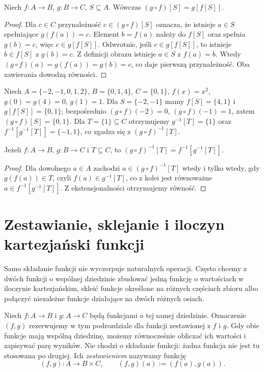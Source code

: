 \begin{twierdzenie}\label{thm:composition-image-xliv}
Niech $f:A\to B$, $g:B\to C$, $S\subseteq A$. Wówczas
$(g\circ f)[S]=g[f[S]]$.
\end{twierdzenie}
\begin{proof}
Dla $c\in C$ przynależność $c\in(g\circ f)[S]$ oznacza,
że istnieje $a\in S$ spełniające $g(f(a))=c$.
Element $b=f(a)$ należy do $f[S]$ oraz spełnia $g(b)=c$,
więc $c\in g[f[S]]$.
Odwrotnie, jeśli $c\in g[f[S]]$, to istnieje $b\in f[S]$
z $g(b)=c$. Z definicji obrazu istnieje $a\in S$ z $f(a)=b$.
Wtedy $(g\circ f)(a)=g(f(a))=g(b)=c$, co daje pierwszą
przynależność. Oba zawierania dowodzą równości.
\end{proof}
\begin{przyklad}
Niech $A=\{-2,-1,0,1,2\}$, $B=\{0,1,4\}$,
$C=\{0,1\}$, $f(x)=x^2$, $g(0)=g(4)=0$, $g(1)=1$.
Dla $S=\{-2,-1\}$ mamy $f[S]=\{4,1\}$ i
$g[f[S]]=\{0,1\}$; bezpośrednio $(g\circ f)(-2)=0$,
$(g\circ f)(-1)=1$, zatem $(g\circ f)[S]=\{0,1\}$.
Dla $T=\{1\}\subseteq C$ otrzymujemy
$g^{-1}[T]=\{1\}$ oraz
$f^{-1}[g^{-1}[T]]=\{-1,1\}$,
co zgadza się z $(g\circ f)^{-1}[T]$.
\end{przyklad}

\begin{twierdzenie}\label{thm:composition-preimage}
Jeżeli $f:A\to B$, $g:B\to C$ i $T\subseteq C$, to $(g\circ f)^{-1}[T]=f^{-1}[g^{-1}[T]]$.
\end{twierdzenie}
\begin{proof}
Dla dowolnego $a\in A$ zachodzi $a\in(g\circ f)^{-1}[T]$ wtedy i tylko wtedy, gdy $g(f(a))\in T$, czyli $f(a)\in g^{-1}[T]$, co z kolei jest równoważne $a\in f^{-1}[g^{-1}[T]]$. Z ekstensjonalności otrzymujemy równość.
\end{proof}

\section{Zestawianie, sklejanie i iloczyn kartezjański funkcji}
Samo składanie funkcji nie wyczerpuje naturalnych operacji. Często chcemy
z dwóch funkcji o wspólnej dziedzinie zbudować jedną funkcję o wartościach
w iloczynie kartezjańskim, skleić funkcje określone na różnych częściach
zbioru albo połączyć niezależne funkcje działające na dwóch różnych osiach.

\begin{definicja}\label{def:pairing-functions}
Niech $f:A\to B$ i $g:A\to C$ będą funkcjami o tej samej dziedzinie.
Oznaczenie $(f,g)$ rezerwujemy w tym podrozdziale dla funkcji
zestawionej z $f$ i $g$. Gdy obie funkcje mają wspólną dziedzinę,
możemy równocześnie obliczać ich wartości i zapisywać parę wyników.
Nie chodzi o składanie funkcji: żadna funkcja nie jest tu stosowana po drugiej.
Ich \emph{zestawieniem} nazywamy funkcję
\[
(f,g):A\to B\times C,
\qquad
(f,g)(a):=(f(a),g(a)).
\]
\end{definicja}

